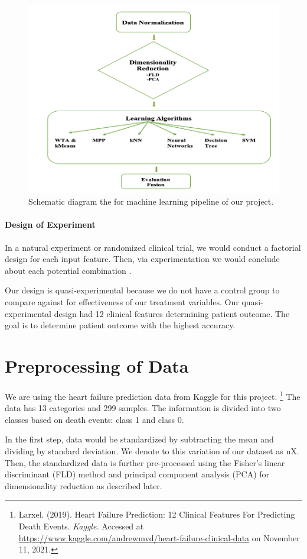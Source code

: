 \documentclass{article}
\begin{document}
\begin{figure}[h]
    \centering
    \includegraphics[width=0.6\linewidth]{Picture1.png}
    \caption{Schematic diagram the for machine learning pipeline of our project.}
    \label{fig:mlpipe}
\end{figure}

\paragraph{Design of Experiment} In a natural experiment or randomized clinical trial, we would conduct a factorial design for each input feature. Then, via experimentation we would conclude about each potential combination \citep{montgomery2017design}. 

Our design is quasi-experimental because we do not have a control group to compare against for effectiveness of our treatment variables. Our quasi-experimental design had 12 clinical features determining patient outcome. The goal is to determine patient outcome with the highest accuracy.

\section{Preprocessing of Data}

We are using the heart failure prediction data from Kaggle for this project. 
\footnote{Larxel. (2019). Heart Failure Prediction: 12 Clinical Features For Predicting Death Events. \textit{Kaggle.} Accessed at \href{https://www.kaggle.com/andrewmvd/heart-failure-clinical-data}{https://www.kaggle.com/andrewmvd/heart-failure-clinical-data} on November 11, 2021.}
The data has 13 categories and 299 samples. The information is divided into two classes based on death events: class 1 and class 0. 

In the first step, data would be standardized by subtracting the mean and dividing by standard deviation. We denote to this variation of our dataset as nX. Then, the standardized data is further pre-processed using the Fisher’s linear discriminant (FLD) method and principal component analysis (PCA) for dimensionality reduction as described later.
\end{document}

